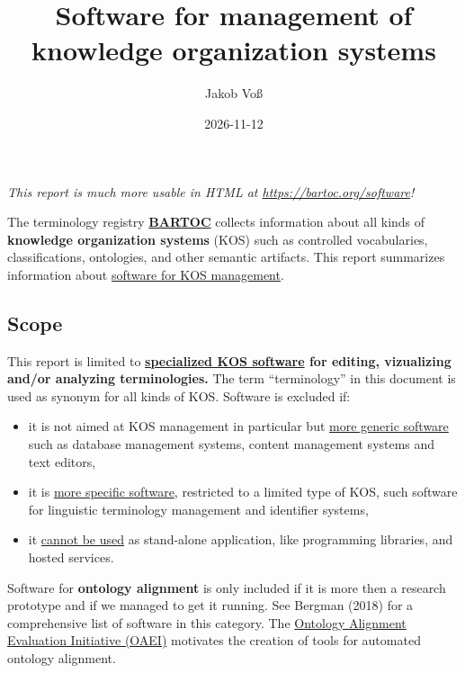 \documentclass[
  DIV=10]{article}
\title{Software for management of knowledge organization systems}
\author{Jakob Voß}
\affil{%
                  Verbundzentrale des GBV (VZG)
              }
\date{2026-11-12}
\providecommand{\tightlist}{%
  \setlength{\itemsep}{0pt}\setlength{\parskip}{0pt}}
\begin{document}
\maketitle


\large

\emph{This report is much more usable in HTML at
\url{https://bartoc.org/software}!} \vspace*{20mm}

The terminology registry \textbf{\href{https://bartoc.org/}{BARTOC}}
collects information about all kinds of \textbf{knowledge organization
systems} (KOS) such as controlled vocabularies, classifications,
ontologies, and other semantic artifacts. This report summarizes
information about \hyperref[kos-software]{software for KOS management}.

\subsection{Scope}\label{scope}

This report is limited to \textbf{\hyperref[kos-software]{specialized
KOS software} for editing, vizualizing and/or analyzing terminologies.}
The term ``terminology'' in this document is used as synonym for all
kinds of KOS. Software is excluded if:

\begin{itemize}
\tightlist
\item
  it is not aimed at KOS management in particular but
  \hyperref[more-generic-software]{more generic software} such as
  database management systems, content management systems and text
  editors,
\item
  it is \hyperref[more-specific-software]{more specific software},
  restricted to a limited type of KOS, such software for linguistic
  terminology management and identifier systems,
\item
  it \hyperref[limited-use]{cannot be used} as stand-alone application,
  like programming libraries, and hosted services.
\end{itemize}

Software for \textbf{ontology alignment} is only included if it is more
then a research prototype and if we managed to get it running. See
Bergman (2018) for a comprehensive list of software in this category.
The \href{https://oaei.ontologymatching.org/}{Ontology Alignment
Evaluation Initiative (OAEI)} motivates the creation of tools for
automated ontology alignment.

\newpage
{}
\recalctypearea
\end{document}
